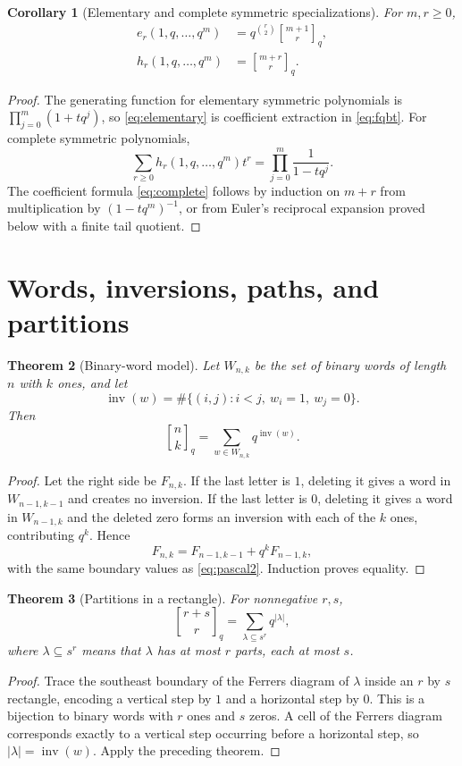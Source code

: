 \documentclass[11pt]{article}
\numberwithin{equation}{section}
\newtheorem{theorem}{Theorem}[section]
\newtheorem{corollary}[theorem]{Corollary}
\theoremstyle{definition}
\newcommand{\qbinom}[2]{\genfrac{[}{]}{0pt}{}{#1}{#2}_{q}}
\newcommand{\inv}{\operatorname{inv}}
\begin{document}
\begin{corollary}[Elementary and complete symmetric specializations]
For $m,r\ge0$,
\begin{align}
e_r(1,q,\ldots,q^m)&=q^{\binom r2}\genfrac{[}{]}{0pt}{}{m+1}{r}_q,\label{eq:elementary}\\
h_r(1,q,\ldots,q^m)&=\genfrac{[}{]}{0pt}{}{m+r}{r}_q.\label{eq:complete}
\end{align}
\end{corollary}
\begin{proof}
The generating function for elementary symmetric polynomials is $\prod_{j=0}^m(1+tq^j)$, so \eqref{eq:elementary} is coefficient extraction in \eqref{eq:fqbt}.  For complete symmetric polynomials,
\[
\sum_{r\ge0}h_r(1,q,\ldots,q^m)t^r=\prod_{j=0}^m\frac1{1-tq^j}.
\]
The coefficient formula \eqref{eq:complete} follows by induction on $m+r$ from multiplication by $(1-tq^m)^{-1}$, or from Euler's reciprocal expansion proved below with a finite tail quotient.
\end{proof}

\section{Words, inversions, paths, and partitions}
\begin{theorem}[Binary-word model]
Let $W_{n,k}$ be the set of binary words of length $n$ with $k$ ones, and let
\[
\inv(w)=\#\{(i,j):i<j,\ w_i=1,\ w_j=0\}.
\]
Then
\[
\qbinom nk=\sum_{w\in W_{n,k}}q^{\inv(w)}.
\]
\end{theorem}
\begin{proof}
Let the right side be $F_{n,k}$.  If the last letter is $1$, deleting it gives a word in $W_{n-1,k-1}$ and creates no inversion.  If the last letter is $0$, deleting it gives a word in $W_{n-1,k}$ and the deleted zero forms an inversion with each of the $k$ ones, contributing $q^k$.  Hence
\[
F_{n,k}=F_{n-1,k-1}+q^kF_{n-1,k},
\]
with the same boundary values as \eqref{eq:pascal2}.  Induction proves equality.
\end{proof}

\begin{theorem}[Partitions in a rectangle]
For nonnegative $r,s$,
\[
\genfrac{[}{]}{0pt}{}{r+s}{r}_q
=\sum_{\lambda\subseteq s^r}q^{|\lambda|},
\]
where $\lambda\subseteq s^r$ means that $\lambda$ has at most $r$ parts, each at most $s$.
\end{theorem}
\begin{proof}
Trace the southeast boundary of the Ferrers diagram of $\lambda$ inside an $r$ by $s$ rectangle, encoding a vertical step by $1$ and a horizontal step by $0$.  This is a bijection to binary words with $r$ ones and $s$ zeros.  A cell of the Ferrers diagram corresponds exactly to a vertical step occurring before a horizontal step, so $|\lambda|=\inv(w)$.  Apply the preceding theorem.
\end{proof}
\end{document}
